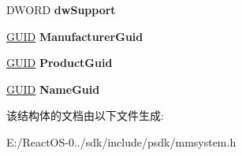 \begin{DoxyCompactItemize}
D\+W\+O\+RD {\bfseries dw\+Support}
\item 
\mbox{\label{structtag_w_a_v_e_o_u_t_c_a_p_s2_a_a8a7507b0eb37bdd0e252d29ab2c5cd78}} 
\hyperlink{interface_g_u_i_d}{G\+U\+ID} {\bfseries Manufacturer\+Guid}
\item 
\mbox{\label{structtag_w_a_v_e_o_u_t_c_a_p_s2_a_aaa428aa307dcb6102b546bd587be7cf3}} 
\hyperlink{interface_g_u_i_d}{G\+U\+ID} {\bfseries Product\+Guid}
\item 
\mbox{\label{structtag_w_a_v_e_o_u_t_c_a_p_s2_a_a365ba60bbc5106b6b0ad55d7e55b24a0}} 
\hyperlink{interface_g_u_i_d}{G\+U\+ID} {\bfseries Name\+Guid}
\end{DoxyCompactItemize}


该结构体的文档由以下文件生成\+:\begin{DoxyCompactItemize}
\item 
E\+:/\+React\+O\+S-\/0../sdk/include/psdk/mmsystem.\+h\end{DoxyCompactItemize}
